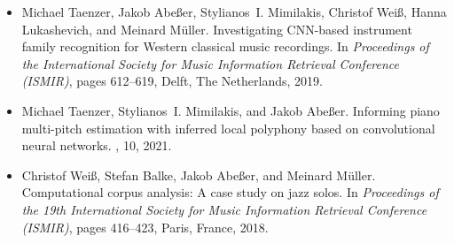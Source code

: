\documentclass[11pt,a4paper]{article}
\theoremstyle{plain} \newtheorem{define}{Definition}[section]
\begin{document}
{{\begin{itemize}


\item
[\cite{TaenzerAMWLM19_InstrumentReco_ISMIR}]
Michael Taenzer, Jakob Abe{\ss}er, Stylianos~I. Mimilakis, Christof Wei{\ss},
  Hanna Lukashevich, and Meinard M{\"u}ller.
\newblock Investigating {CNN}-based instrument family recognition for {W}estern
  classical music recordings.
\newblock In {\em Proceedings of the International Society for Music
  Information Retrieval Conference ({ISMIR})}, pages 612--619, Delft, The
  Netherlands, 2019.

\item
[\cite{TaenzerMA21_LocalPolyphonyEstimation_Electronics}]
Michael Taenzer, Stylianos~I. Mimilakis, and Jakob Abe{\ss}er.
\newblock Informing piano multi-pitch estimation with inferred local polyphony
  based on convolutional neural networks.
, 10, 2021.

\item
[\cite{WeissBAM18_JazzComplexity_ISMIR}]
Christof Wei{\ss}, Stefan Balke, Jakob Abe{\ss}er, and Meinard M{\"u}ller.
\newblock Computational corpus analysis: {A} case study on jazz solos.
\newblock In {\em Proceedings of the 19th International Society for Music
  Information Retrieval Conference ({ISMIR})}, pages 416--423, Paris, France,
  2018.



\end{itemize}}}
\end{document}
